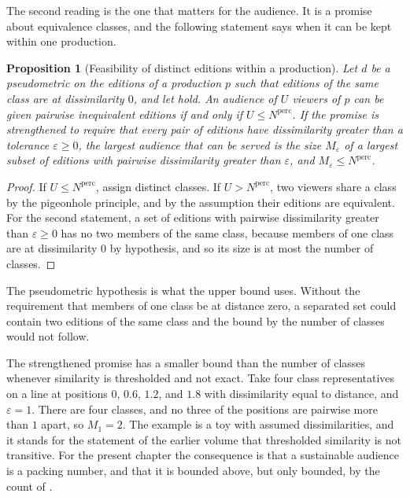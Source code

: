 \documentclass[11pt,twoside,openright]{book}
\theoremstyle{plain}
\newtheorem{proposition}[theorem]{Proposition}
\theoremstyle{definition}
\theoremstyle{remark}
\begin{document}
The second reading is the one that matters for the audience. It is a promise about equivalence classes, and the following statement says when it can be kept within one production.

\begin{proposition}[Feasibility of distinct editions within a production]\label{prop:feasible}
Let $d$ be a pseudometric on the editions of a production $p$ such that editions of the same class are at dissimilarity $0$, and let  hold. An audience of $U$ viewers of $p$ can be given pairwise inequivalent editions if and only if $U\le N^{\mathrm{perc}}$. If the promise is strengthened to require that every pair of editions have dissimilarity greater than a tolerance $\varepsilon\ge0$, the largest audience that can be served is the size $M_\varepsilon$ of a largest subset of editions with pairwise dissimilarity greater than $\varepsilon$, and $M_\varepsilon\le N^{\mathrm{perc}}$.
\end{proposition}

\begin{proof}
If $U\le N^{\mathrm{perc}}$, assign distinct classes. If $U>N^{\mathrm{perc}}$, two viewers share a class by the pigeonhole principle, and by the assumption their editions are equivalent. For the second statement, a set of editions with pairwise dissimilarity greater than $\varepsilon\ge0$ has no two members of the same class, because members of one class are at dissimilarity $0$ by hypothesis, and so its size is at most the number of classes.
\end{proof}

The pseudometric hypothesis is what the upper bound uses. Without the requirement that members of one class be at distance zero, a separated set could contain two editions of the same class and the bound by the number of classes would not follow.

The strengthened promise has a smaller bound than the number of classes whenever similarity is thresholded and not exact. Take four class representatives on a line at positions $0$, $0.6$, $1.2$, and $1.8$ with dissimilarity equal to distance, and $\varepsilon=1$. There are four classes, and no three of the positions are pairwise more than $1$ apart, so $M_1=2$. The example is a toy with assumed dissimilarities, and it stands for the statement of the earlier volume that thresholded similarity is not transitive. For the present chapter the consequence is that a sustainable audience is a packing number, and that it is bounded above, but only bounded, by the count of .
\end{document}
